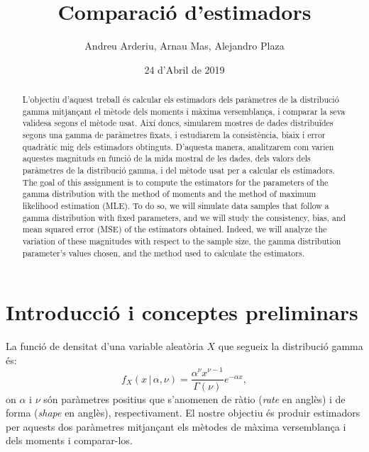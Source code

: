 \documentclass[12pt, catalan]{article}
\title{\sffamily \bfseries Comparació d'estimadors}
\author{\sffamily Andreu Arderiu, Arnau Mas, Alejandro Plaza}
\date{24 d'Abril de 2019}
\numberwithin{table}{section}
\numberwithin{figure}{section}
\numberwithin{equation}{section}
\newcommand{\cond}{\, \vert \,}
\begin{document}
\maketitle

\begin{abstract}
    L'objectiu d'aquest treball és calcular els estimadors dels paràmetres de la distribució gamma mitjançant el mètode dels moments i màxima versemblança, i comparar la seva validesa segons el mètode usat. 
   Així doncs, simularem mostres de dades distribuïdes segons una gamma de paràmetres fixats, i estudiarem la consistència, biaix i error quadràtic mig dels estimadors obtinguts. D'aquesta manera, analitzarem com varien aquestes magnituds en funció de la mida mostral de les dades, dels valors dels paràmetres de la distribució gamma, i del mètode usat per a calcular els estimadors.\vspace{0.5cm}\\
   The goal of this assignment is to compute the estimators for the parameters of the gamma distribution with the method of moments and the method of maximum likelihood estimation (MLE).
   To do so, we will simulate data samples that follow a gamma distribution with fixed parameters, and we will study the consistency, bias, and mean squared error (MSE) of the estimators obtained. Indeed, we will analyze the variation of these magnitudes with respect to the sample size, the gamma distribution parameter's values chosen, and the method used to calculate the estimators.
\end{abstract}

\section{Introducció i conceptes preliminars}
La funció de densitat d'una variable aleatòria \( X \) que segueix la distribució gamma és:
\begin{equation*}
	f_X(x \cond \alpha, \nu) = \frac{\alpha^\nu x^{\nu - 1}}{\Gamma(\nu)} e^{-\alpha x},
\end{equation*}
on \( \alpha \) i \( \nu \) són paràmetres positius que s'anomenen de ràtio (\emph{rate} en anglès) i de forma (\emph{shape} en anglès), respectivament. El nostre objectiu és produir estimadors per aquests dos paràmetres mitjançant els mètodes de màxima versemblança i dels moments i comparar-los.  
\end{document}
